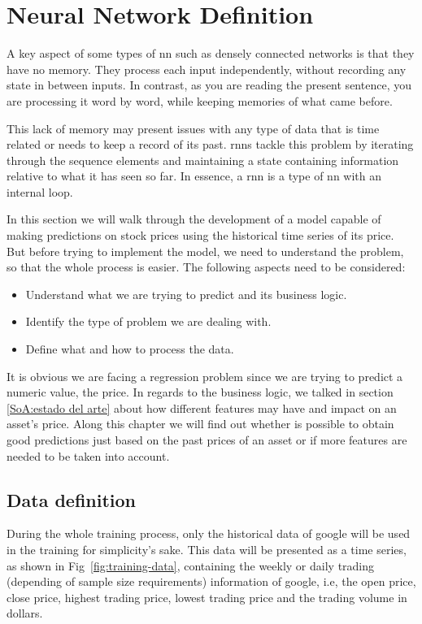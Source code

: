 \section{Neural Network Definition}

A key aspect of some types of \gls{nn} such as densely connected networks is that they have no memory. They process each input independently, without recording any state in between inputs. In contrast, as you are reading the present sentence, you are processing it word by word, while keeping memories of what came before.\cite{deepWithPython}

This lack of memory may present issues with any type of data that is time related or needs to keep a record of its past. \glspl{rnn} tackle this problem by iterating through the sequence elements and maintaining a state containing information relative to what it has seen so far. In essence, a \gls{rnn} is a type of \gls{nn} with an internal loop.

In this section we will walk through the development of a model capable of making predictions on stock prices using the historical time series of its price. But before trying to implement the model, we need to understand the problem, so that the whole process is easier. The following aspects need to be considered:

\begin{itemize}
    \item Understand what we are trying to predict and its business logic.
    \item Identify the type of problem we are dealing with.
    \item Define what and how to process the data.
\end{itemize}

It is obvious we are facing a regression problem since we are trying to predict a numeric value, the price. In regards to the business logic, we talked in section \ref{SoA:estado del arte} about how different features may have and impact on an asset's price. Along this chapter we will find out whether is possible to obtain good predictions just based on the past prices of an asset or if more features are needed to be taken into account.

\subsection{Data definition}

During the whole training process, only the historical data of google will be used in the training for simplicity's sake. This data will be presented as a time series, as shown in Fig~\ref{fig:training-data}, containing the weekly or daily trading (depending of sample size requirements) information of google, i.e, the open price, close price, highest trading price, lowest trading price and the trading volume in dollars.


